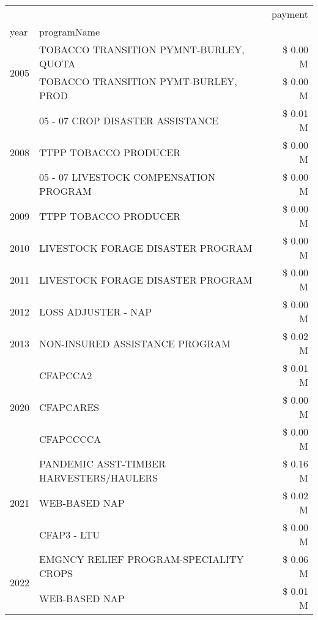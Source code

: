 \begin{tabular}{llr}
\toprule
 &  & payment \\
year & programName &  \\
\midrule
\multirow[t]{2}{*}{2005} & TOBACCO TRANSITION PYMNT-BURLEY, QUOTA & \$ 0.00 M \\
 & TOBACCO TRANSITION PYMT-BURLEY, PROD & \$ 0.00 M \\
\cline{1-3}
\multirow[t]{3}{*}{2008} & 05 - 07 CROP DISASTER ASSISTANCE & \$ 0.01 M \\
 & TTPP TOBACCO PRODUCER & \$ 0.00 M \\
 & 05 - 07 LIVESTOCK COMPENSATION PROGRAM & \$ 0.00 M \\
\cline{1-3}
2009 & TTPP TOBACCO PRODUCER & \$ 0.00 M \\
\cline{1-3}
2010 & LIVESTOCK FORAGE DISASTER PROGRAM & \$ 0.00 M \\
\cline{1-3}
2011 & LIVESTOCK FORAGE DISASTER PROGRAM & \$ 0.00 M \\
\cline{1-3}
2012 & LOSS ADJUSTER - NAP & \$ 0.00 M \\
\cline{1-3}
2013 & NON-INSURED ASSISTANCE PROGRAM & \$ 0.02 M \\
\cline{1-3}
\multirow[t]{3}{*}{2020} & CFAPCCA2 & \$ 0.01 M \\
 & CFAPCARES & \$ 0.00 M \\
 & CFAPCCCCA & \$ 0.00 M \\
\cline{1-3}
\multirow[t]{3}{*}{2021} & PANDEMIC ASST-TIMBER HARVESTERS/HAULERS & \$ 0.16 M \\
 & WEB-BASED NAP & \$ 0.02 M \\
 & CFAP3 - LTU & \$ 0.00 M \\
\cline{1-3}
\multirow[t]{2}{*}{2022} & EMGNCY RELIEF PROGRAM-SPECIALITY CROPS & \$ 0.06 M \\
 & WEB-BASED NAP & \$ 0.01 M \\
\cline{1-3}
\bottomrule
\end{tabular}
